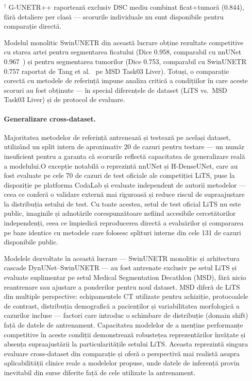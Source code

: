 \documentclass[12pt, a4paper]{report}
\begin{document}
{\footnotesize{$^{\dagger}$ G-UNETR++ raportează exclusiv DSC mediu
combinat ficat+tumoră (0.844), fără detaliere per clasă —
scorurile individuale nu sunt disponibile pentru comparație directă.}}



Modelul monolitic SwinUNETR din această lucrare obține rezultate
competitive cu starea artei pentru segmentarea ficatului
(Dice 0.958, comparabil cu nnUNet 0.967~\cite{isensee2019automated})
și pentru segmentarea tumorilor (Dice 0.753, comparabil cu SwinUNETR
0.757 raportat de Tang et al.~\cite{tang2022swinunetr} pe MSD
Task03 Liver). Totuși, o comparație corectă cu metodele de referință
impune analiza critică a condițiilor în care aceste scoruri au fost
obținute --- în special diferențele de dataset (LiTS vs.\ MSD
Task03 Liver) și de protocol de evaluare.

\paragraph{Generalizare cross-dataset.}
Majoritatea metodelor de referință antrenează și testează pe
același dataset, utilizând un split intern de aproximativ 20 de
cazuri pentru testare — un număr insuficient pentru a garanta
că scorurile reflectă capacitatea de generalizare reală a
modelului.O excepție notabilă o reprezintă nnUNet și H-DenseUNet, care au
fost evaluate pe cele 70 de cazuri de test oficiale ale competiției
LiTS, puse la dispoziție pe platforma CodaLab și evaluate
independent de autorii metodelor — ceea ce conferă o validare
externă mai riguroasă și reduce riscul de supraajustare la
distribuția setului de test. Cu toate acestea, setul de test
oficial LiTS nu este public, imaginile și adnotările
corespunzătoare nefiind accesibile cercetătorilor independenți,
ceea ce împiedică reproducerea directă a evaluărilor și
compararea pe baze identice cu metodele care folosesc splituri
interne din cele 131 de cazuri disponibile public.



Modelele dezvoltate în această lucrare — SwinUNETR monolitic și
arhitectura cascade DynUNet–SwinUNETR — au fost antrenate exclusiv
pe setul LiTS și evaluate suplimentar pe setul Medical Segmentation
Decathlon (MSD), fără nicio reantrenare sau ajustare a ponderilor
pentru noul dataset. MSD diferă de LiTS din multiple perspective:
echipamentele CT utilizate pentru achiziție, protocoalele de
contrast, distribuția demografică a pacienților și variabilitatea
morfologică a cazurilor incluse — factori care introduc o
schimbare de distribuție (domain shift) față de datele de
antrenament. Capacitatea modelelor de a menține performanțe
competitive în aceste condiții demonstrează robustețea
reprezentărilor învățate și absența supraajustării la
particularitățile setului LiTS. Aceasta reprezintă singura
evaluare cross-dataset din comparație și oferă o perspectivă
mai realistă asupra aplicabilității clinice reale a modelelor
propuse, unde datele de inferență provin inevitabil din surse
diferite față de cele utilizate la antrenament.
\end{document}
